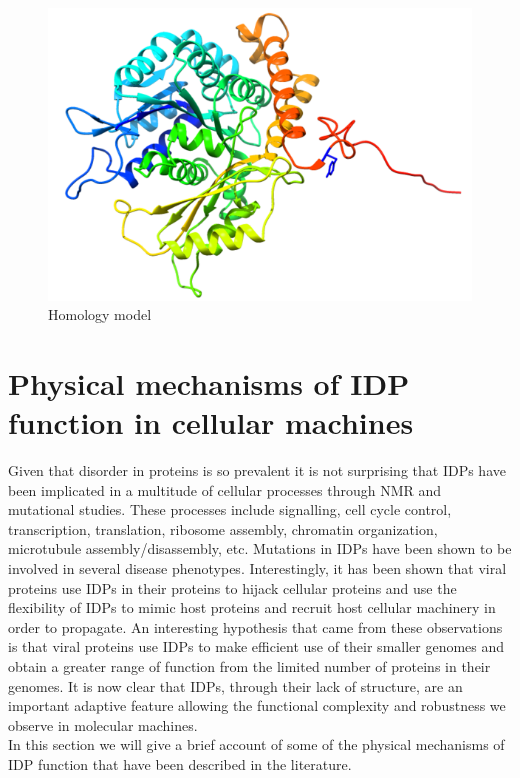 \begin{figure}
\centering
\includegraphics[height=0.3\textheight]{figures/tub4_tyr.png}
\caption{Homology model}
\end{figure}

\section{Physical mechanisms of IDP function in cellular machines}

Given that disorder in proteins is so prevalent it is not surprising that IDPs have been implicated in a multitude of cellular processes through NMR and mutational studies. These processes include signalling, cell cycle control, transcription, translation, ribosome assembly, chromatin organization, microtubule assembly/disassembly, etc. Mutations in IDPs have been shown to be involved in several disease phenotypes.  Interestingly, it has been shown that viral proteins use IDPs in their proteins to hijack cellular proteins and use the flexibility of IDPs to mimic host proteins and recruit host cellular machinery in order to propagate.\cite{davey2011viruses} An interesting hypothesis that came from these observations is that viral proteins use IDPs to make efficient use of their smaller genomes and obtain a greater range of function from the limited number of proteins in their genomes. It is now clear that IDPs, through their lack of structure, are an important adaptive feature allowing the functional complexity and robustness we observe in molecular machines. \\

In this section we will give a brief account of some of the physical mechanisms of IDP function that have been described in the literature. \\

